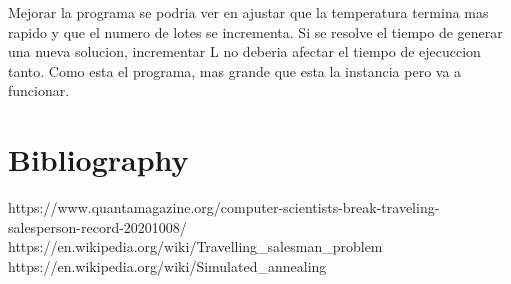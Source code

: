 \documentclass{article}
\begin{document}
    Mejorar la programa se podria ver en ajustar que la temperatura termina mas rapido y que el numero de lotes
    se incrementa. Si se resolve el tiempo de generar una nueva solucion, incrementar L no deberia afectar
    el tiempo de ejecuccion tanto. Como esta el programa, mas grande que esta la instancia pero va a funcionar.
    \section{Bibliography}
    https://www.quantamagazine.org/computer-scientists-break-traveling-salesperson-record-20201008/\\
    https://en.wikipedia.org/wiki/Travelling\_salesman\_problem\\
    https://en.wikipedia.org/wiki/Simulated\_annealing\\
\end{document}
